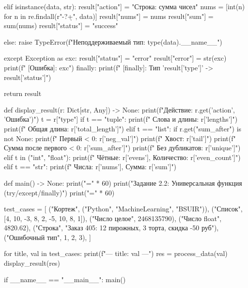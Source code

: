 \documentclass[14pt,a4paper]{extarticle}
\begin{document}
\begin{CodeListing}
        elif isinstance(data, str):
            result["action"] = "Строка: сумма чисел"
            nums = [int(n) for n in re.findall(r"-?\d+", data)]
            result["nums"] = nums
            result["sum"] = sum(nums)
            result["status"] = "success"

        else:
            raise TypeError(f"Неподдерживаемый тип: {type(data).__name__}")

    except Exception as exc:
        result["status"] = "error"
        result["error"] = str(exc)
        print(f"  [Ошибка]: {exc}")
    finally:
        print(f"  [finally]: Тип '{result['type']}' -> {result['status']}")

    return result


def display_result(r: Dict[str, Any]) -> None:
    print(f"Действие: {r.get('action', 'Ошибка')}")
    t = r["type"]
    if t == "tuple":
        print(f"  Слова и длины: {r['lengths']}")
        print(f"  Общая длина:   {r['total_length']}")
    elif t == "list":
        if r.get("sum_after") is not None:
            print(f"  Первый < 0: {r['neg_val']}")
            print(f"  Хвост:      {r['tail']}")
            print(f"  Сумма после первого < 0: {r['sum_after']}")
        print(f"  Без дубликатов: {r['unique']}")
    elif t in ("int", "float"):
        print(f"  Чётные: {r['evens']}, Количество: {r['even_count']}")
    elif t == "str":
        print(f"  Числа: {r['nums']}, Сумма: {r['sum']}")


def main() -> None:
    print("=" * 60)
    print("Задание 2.2: Универсальная функция (try/except/finally)")
    print("=" * 60)

    test_cases = [
        ("Кортеж", ("Python", "MachineLearning", "BSUIR")),
        ("Список", [4, 10, -3, 8, 2, -5, 10, 8, 1]),
        ("Число целое", 2468135790),
        ("Число float", 4820.62),
        ("Строка", "Заказ 405: 12 пирожных, 3 торта, скидка -50 руб"),
        ("Ошибочный тип", {1, 2, 3}),
    ]

    for title, val in test_cases:
        print(f"\n--- {title}: {val} ---")
        res = process_data(val)
        display_result(res)


if __name__ == "__main__":
    main()
\end{CodeListing}
\end{document}

